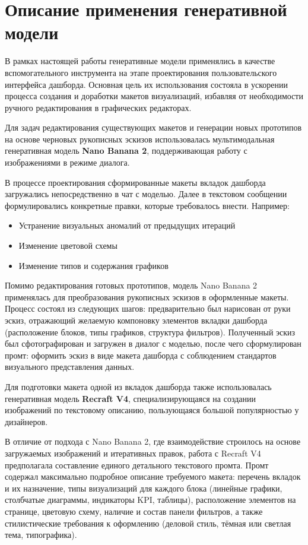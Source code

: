 \section{Описание применения генеративной модели}

В рамках настоящей работы генеративные модели применялись в качестве вспомогательного инструмента на этапе проектирования пользовательского интерфейса дашборда. Основная цель их использования состояла в ускорении процесса создания и доработки макетов визуализаций, избавляя от необходимости ручного редактирования в графических редакторах.

Для задач редактирования существующих макетов и генерации новых прототипов на основе черновых рукописных эскизов использовалась мультимодальная генеративная модель \textbf{Nano Banana 2}, поддерживающая работу с изображениями в режиме диалога.

В процессе проектирования сформированные макеты вкладок дашборда загружались непосредственно в чат с моделью. Далее в текстовом сообщении формулировались конкретные правки, которые требовалось внести. Например:

\begin{itemize}
    \item Устранение визуальных аномалий от предыдущих итераций
    \item Изменение цветовой схемы
    \item Изменение типов и содержания графиков
\end{itemize}

Помимо редактирования готовых прототипов, модель Nano Banana 2 применялась для преобразования рукописных эскизов в оформленные макеты. Процесс состоял из следующих шагов: предварительно был нарисован от руки эскиз, отражающий желаемую компоновку элементов вкладки дашборда (расположение блоков, типы графиков, структура фильтров). Полученный эскиз был сфотографирован и загружен в диалог с моделью, после чего сформулирован промт: оформить эскиз в виде макета дашборда с соблюдением стандартов визуального представления данных.

Для подготовки макета одной из вкладок дашборда также использовалась генеративная модель \textbf{Recraft V4}, специализирующаяся на создании изображений по текстовому описанию, пользующаяся большой популярностью у дизайнеров.

В отличие от подхода с Nano Banana 2, где взаимодействие строилось на основе загружаемых изображений и итеративных правок, работа с Recraft V4 предполагала составление единого детального текстового промта. Промт содержал максимально подробное описание требуемого макета: перечень вкладок и их назначение, типы визуализаций для каждого блока (линейные графики, столбчатые диаграммы, индикаторы KPI, таблицы), расположение элементов на странице, цветовую схему, наличие и состав панели фильтров, а также стилистические требования к оформлению (деловой стиль, тёмная или светлая тема, типографика).

